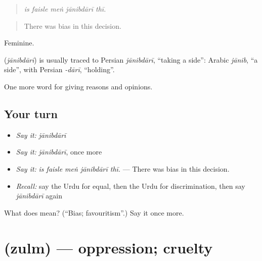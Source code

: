 \begin{quote}
    
\end{quote}

\begin{quote}
\emph{is faisle meṅ jānibdārī thī.}
\end{quote}

\begin{quote}
There was bias in this decision.
\end{quote}

Feminine.

\begin{cousinweb}
\textbf{} (\emph{jānibdārī}) is usually traced to Persian \emph{jānibdārī}, \textquotedblleft{}taking a side\textquotedblright{}: Arabic \emph{jānib}, \textquotedblleft{}a side\textquotedblright{}, with Persian \emph{-dārī}, \textquotedblleft{}holding\textquotedblright{}.
\end{cousinweb}

\begin{grammarlens}[title={What you've built}]
One more word for giving reasons and opinions.
\end{grammarlens}

\subsection*{Your turn}
\begin{itemize}
\raggedright
  \item \emph{Say it:} \emph{jānibdārī}
  \item \emph{Say it:} \emph{jānibdārī}, once more
  \item \emph{Say it:} \emph{is faisle meṅ jānibdārī thī.} — There was bias in this decision.
  \item \emph{Recall:} say the Urdu for equal, then the Urdu for discrimination, then say \emph{jānibdārī} again
\end{itemize}

\begin{tcolorbox}[breakable,colback=teal!4,colframe=teal!35!black,title={Before you move on}]
What does  mean? (\textquotedblleft{}Bias; favouritism\textquotedblright{}.) Say it once more.
\end{tcolorbox}
\section[\texorpdfstring{\ur{ظلم} (zulm)}{ظلم (zulm)}]{ (zulm) — oppression; cruelty}

